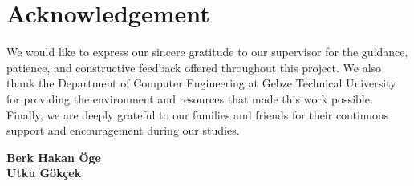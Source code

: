 \chapter*{Acknowledgement}

We would like to express our sincere gratitude to our supervisor for the
guidance, patience, and constructive feedback offered throughout this project.
We also thank the Department of Computer Engineering at Gebze Technical
University for providing the environment and resources that made this work
possible. Finally, we are deeply grateful to our families and friends for
their continuous support and encouragement during our studies.

\vspace{1cm}
\begin{flushright}
\textbf{Berk Hakan Öge \\ Utku Gökçek} %
\end{flushright}
\clearpage
